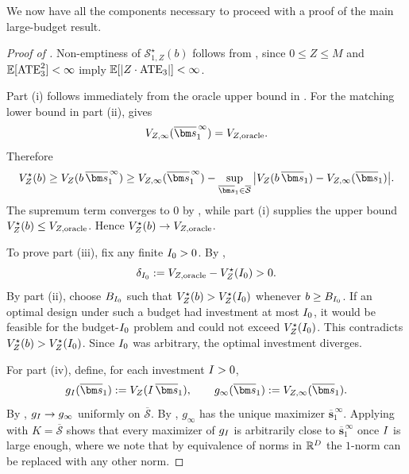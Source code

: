 We now have all the components necessary to proceed with a proof of the main large-budget result.

\begin{proof}[Proof of ]
  Non-emptiness of $\mathcal S_{1,Z}^\star(b)$ follows from , since $0\le Z\le M$ and $\mathbb{E}[\mathrm{ATE}_3^2]<\infty$ imply $\mathbb{E}[|Z \cdot \mathrm{ATE}_3|]<\infty$.

  Part (i) follows immediately from the oracle upper bound in .
  For the matching lower bound in part (ii),  gives
  \[
    V_{Z,\noisefree}(\overline{\bm s}_1^{\,\infty})=V_{Z,\oracle}.
  \]
  Therefore
  \[
    V_Z^\star(b)
    \ge
    V_Z(b\,\overline{\bm s}_1^{\,\infty})
    \ge
    V_{Z,\noisefree}(\overline{\bm s}_1^{\,\infty})
    -
    \sup_{\overline{\bm s}_1\in\overline{\mathcal{S}}}
    \big|V_Z(b\,\overline{\bm s}_1)-V_{Z,\noisefree}(\overline{\bm s}_1)\big|.
  \]
  The supremum term converges to $0$ by , while part (i) supplies the upper bound $V_Z^\star(b)\le V_{Z,\mathrm{oracle}}$.
  Hence $V_Z^\star(b)\to V_{Z,\mathrm{oracle}}$.

  To prove part (iii), fix any finite $I_0>0$.
  By ,
  \[
    \delta_{I_0}
    :=
    V_{Z,\mathrm{oracle}}-V_Z^\star(I_0)
    >0.
  \]
  By part (ii), choose $B_{I_0}$ such that $V_Z^\star(b)>V_Z^\star(I_0)$ whenever $b\ge B_{I_0}$.
  If an optimal design under such a budget had investment at most $I_0$, it would be feasible for the budget-$I_0$ problem and could not exceed $V_Z^\star(I_0)$.
  This contradicts $V_Z^\star(b)>V_Z^\star(I_0)$.
  Since $I_0$ was arbitrary, the optimal investment diverges.

  For part (iv), define, for each investment $I>0$,
  \[
    g_\invst(\overline{\bm s}_1)
    \defeq
    V_Z(\invst\,\overline{\bm s}_1),
    \qquad
    g_\infty(\overline{\bm s}_1)
    \defeq
    V_{Z,\noisefree}(\overline{\bm s}_1).
  \]
  By , $g_I\to g_\infty$ uniformly on $\overline{\mathcal S}$.
  By , $g_\infty$ has the unique maximizer $\overline{\bm s}_1^{\,\infty}$.
  Applying  with $K=\overline{\mathcal S}$ shows that every maximizer of $g_I$ is arbitrarily close to $\overline{\bm s}_1^{\,\infty}$ once $I$ is large enough, where we note that by equivalence of norms in $\mathbb{R}^D$ the $1$-norm can be replaced with any other norm.


\end{proof}
